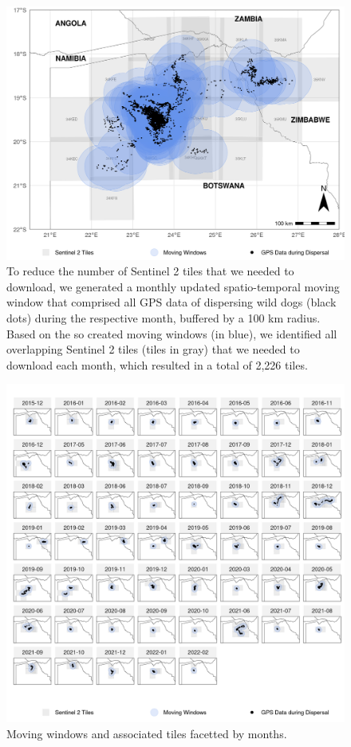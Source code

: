 \documentclass[abstract=on,10pt,a4paper,bibliography=totocnumbered]{article}
\begin{document}
\begin{figure}[htbp]
 \begin{center}
  \includegraphics[width = \textwidth]{Figures/MovingWindows.png}
  \caption{To reduce the number of Sentinel 2 tiles that we needed to download,
  we generated a monthly updated spatio-temporal moving window that comprised
  all GPS data of dispersing wild dogs (black dots) during the respective month,
  buffered by a 100 km radius. Based on the so created moving windows (in blue),
  we identified all overlapping Sentinel 2 tiles (tiles in gray) that we needed
  to download each month, which resulted in a total of 2,226 tiles.}
  \label{MovingWindows}
 \end{center}
\end{figure}

\begin{figure}[htbp]
 \begin{center}
  \includegraphics[width = \textwidth]{Figures/MovingWindows2.png}
  \caption{Moving windows and associated tiles facetted by months.}
  \label{MovingWindows2}
 \end{center}
\end{figure}
\end{document}
